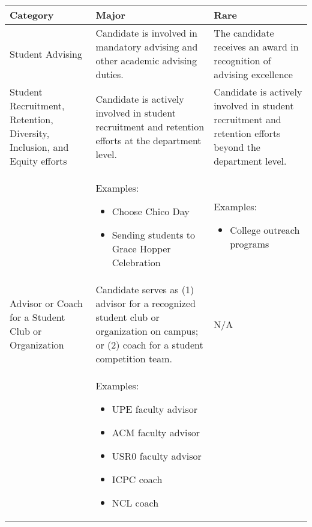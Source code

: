 \documentclass{scrartcl}
\begin{document}
\begin{longtable}{p{3cm}p{5.5cm}P{5.5cm}}

\hline
\textbf{Category} & \textbf{Major} & \textbf{Rare}\\
\hline
\endhead %
 Student Advising
 & Candidate is involved in mandatory advising and other academic advising duties. %
 & The candidate receives an award in recognition of advising excellence \\ 
 \hline
 Student   Recruitment, Retention, Diversity, Inclusion, and Equity efforts & Candidate is actively involved in student recruitment and retention efforts at the department level. & Candidate is actively involved in student recruitment and retention efforts beyond the department level. \\
 &
 Examples:
	\begin{itemize}[noitemsep,leftmargin=*,topsep=0pt,partopsep=0pt]
    \item Choose Chico Day
    \item Sending students to Grace Hopper Celebration
	\end{itemize}
  & %
  Examples:
    \begin{itemize}[noitemsep,leftmargin=*,topsep=0pt,partopsep=0pt]
        \item College outreach programs
    \end{itemize}\\ 
\hline
Advisor or Coach for a Student Club or Organization & Candidate serves as (1) advisor for a recognized student club or organization on campus; or (2) coach for a student competition team. & N/A \\
& Examples:
	\begin{itemize}[noitemsep,leftmargin=*,topsep=0pt,partopsep=0pt]
    \item UPE faculty advisor
    \item ACM faculty advisor
    \item USR0 faculty advisor
    \item ICPC coach
    \item NCL coach


\end{itemize}
\end{longtable}
\end{document}
